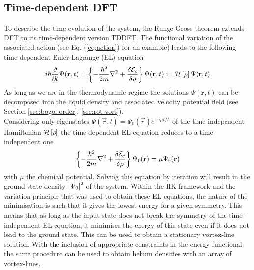 	\subsection{Time-dependent DFT}
	To describe the time evolution of the system, the Runge-Gross theorem extends DFT to its time-dependent version TDDFT\citep{Run84}. The functional variation of the associated action (see Eq. (\ref{eq:action}) for an example) leads to the following time-dependent Euler-Lagrange (EL) equation 
	\begin{align}
		i\hbar\frac{\partial}{\partial t} \Psi({\mathbf r},t) = \left\{-\frac{\hbar^2}{2m}\laplacian + \fdv{\mathcal{E}_c}{\rho}\right\}\Psi(\textbf{r},t) \vcentcolon= {\cal H}\left[\rho\right]\Psi(\textbf{r},t) 
		\label{eq:td-el-equation}
	\end{align}
	As long as we are in the thermodynamic regime the solutions $\Psi(\textbf{r},t)$ can be decomposed into the liquid density and associated velocity potential field (see Section \ref{sec:bogol-order}, \ref{sec:rot-vort}).\\
	
	Considering only eigenstates $\Psi(\vec{r},t)=\Psi_0(\vec{r})\unit{e}^{-i\mu t/\hbar}$ of the time independent Hamiltonian ${\cal H}\left[\rho\right]$ the time-dependent EL-equation reduces to a time independent one
	\begin{align}
		\left\{-\frac{\hbar^2}{2m} \laplacian + \fdv{\mathcal{E}_c}{\rho}\right\}\Psi_0(\textbf{r}) = \mu\Psi_0(\textbf{r})
		\label{eq:el-equation}
	\end{align}
	with $\mu$ the chemical potential. Solving this equation by iteration will result in the ground state density $\abs{\Psi_0}^2$ of the system. Within the HK-framework and the variation principle that was used to obtain these EL-equations, the nature of the minimisation is such that it gives the lowest energy for a given symmetry. This means that as long as the input state does not break the symmetry of the time-independent EL-equation, it minimises the energy of this state even if it does not lead to the ground state. This can be used to obtain a stationary vortex-line solution. With the inclusion of appropriate constraints in the energy functional the same procedure can be used to obtain helium densities with an array of vortex-lines.   

